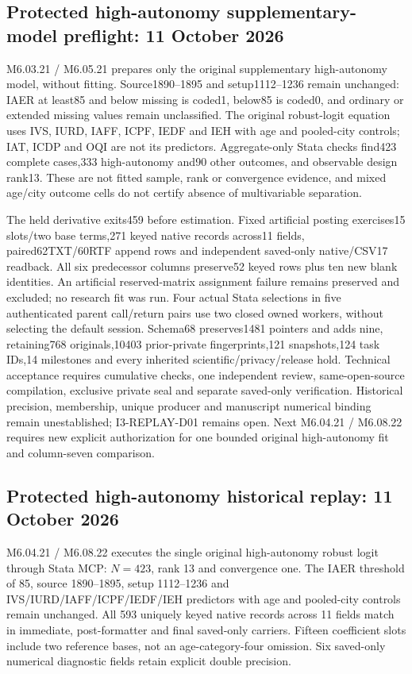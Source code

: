 \documentclass[11pt,a4paper]{article}
\begin{document}
\subsection*{Protected high-autonomy supplementary-model preflight: 11 October 2026}
M6.03.21 / M6.05.21 prepares only the original supplementary high-autonomy model, without fitting. Source1890--1895 and setup1112--1236 remain unchanged: IAER at least85 and below missing is coded1, below85 is coded0, and ordinary or extended missing values remain unclassified. The original robust-logit equation uses IVS, IURD, IAFF, ICPF, IEDF and IEH with age and pooled-city controls; IAT, ICDP and OQI are not its predictors. Aggregate-only Stata checks find423 complete cases,333 high-autonomy and90 other outcomes, and observable design rank13. These are not fitted sample, rank or convergence evidence, and mixed age/city outcome cells do not certify absence of multivariable separation.

The held derivative exits459 before estimation. Fixed artificial posting exercises15 slots/two base terms,271 keyed native records across11 fields, paired62TXT/60RTF append rows and independent saved-only native/CSV17 readback. All six predecessor columns preserve52 keyed rows plus ten new blank identities. An artificial reserved-matrix assignment failure remains preserved and excluded; no research fit was run. Four actual Stata selections in five authenticated parent call/return pairs use two closed owned workers, without selecting the default session. Schema68 preserves1481 pointers and adds nine, retaining768 originals,10403 prior-private fingerprints,121 snapshots,124 task IDs,14 milestones and every inherited scientific/privacy/release hold. Technical acceptance requires cumulative checks, one independent review, same-open-source compilation, exclusive private seal and separate saved-only verification. Historical precision, membership, unique producer and manuscript numerical binding remain unestablished; I3-REPLAY-D01 remains open. Next M6.04.21 / M6.08.22 requires new explicit authorization for one bounded original high-autonomy fit and column-seven comparison.
\subsection*{Protected high-autonomy historical replay: 11 October 2026}
M6.04.21 / M6.08.22 executes the single original high-autonomy robust logit through Stata MCP: $N=423$, rank 13 and convergence one. The IAER threshold of 85, source 1890--1895, setup 1112--1236 and IVS/IURD/IAFF/ICPF/IEDF/IEH predictors with age and pooled-city controls remain unchanged. All 593 uniquely keyed native records across 11 fields match in immediate, post-formatter and final saved-only carriers. Fifteen coefficient slots include two reference bases, not an age-category-four omission. Six saved-only numerical diagnostic fields retain explicit double precision.
\end{document}
